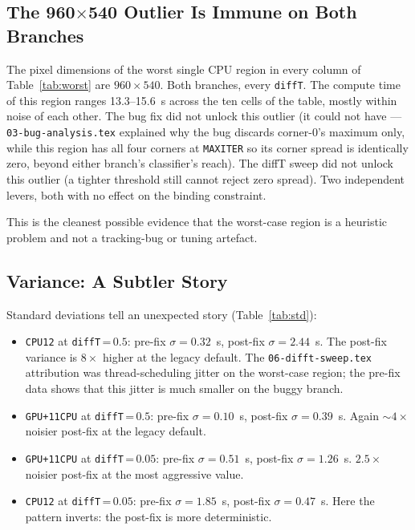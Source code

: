 \documentclass[
	english,
	letterpaper, oneside
]{article}
\begin{document}
\subsection{The 960$\times$540 Outlier Is Immune on Both Branches}

The pixel dimensions of the worst single CPU region in every column of
Table~\ref{tab:worst} are $960\times540$. Both branches, every
\texttt{diffT}. The compute time of this region ranges 13.3--15.6~s
across the ten cells of the table, mostly within noise of each other.
The bug fix did not unlock this outlier (it could not have ---
\texttt{03-bug-analysis.tex} explained why the bug discards corner-0's
maximum only, while this region has all four corners at
\texttt{MAXITER} so its corner spread is identically zero, beyond
either branch's classifier's reach). The diffT sweep did not unlock
this outlier (a tighter threshold still cannot reject zero spread).
Two independent levers, both with no effect on the binding
constraint.

This is the cleanest possible evidence that the worst-case region is
a heuristic problem and not a tracking-bug or tuning artefact.

\subsection{Variance: A Subtler Story}

Standard deviations tell an unexpected story
(Table~\ref{tab:std}):

\begin{itemize}
    \item \texttt{CPU12} at \texttt{diffT}\,=\,$0.5$: pre-fix
    $\sigma = 0.32$~s, post-fix $\sigma = 2.44$~s. The post-fix
    variance is $8 \times$ higher at the legacy default. The
    \texttt{06-difft-sweep.tex} attribution was thread-scheduling
    jitter on the worst-case region; the pre-fix data shows that this
    jitter is much smaller on the buggy branch.
    \item \texttt{GPU+11CPU} at \texttt{diffT}\,=\,$0.5$:
    pre-fix $\sigma = 0.10$~s, post-fix $\sigma = 0.39$~s. Again
    $\sim 4 \times$ noisier post-fix at the legacy default.
    \item \texttt{GPU+11CPU} at \texttt{diffT}\,=\,$0.05$:
    pre-fix $\sigma = 0.51$~s, post-fix $\sigma = 1.26$~s.
    $2.5 \times$ noisier post-fix at the most aggressive value.
    \item \texttt{CPU12} at \texttt{diffT}\,=\,$0.05$: pre-fix
    $\sigma = 1.85$~s, post-fix $\sigma = 0.47$~s. Here the pattern
    inverts: the post-fix is more deterministic.
\end{itemize}
\end{document}
